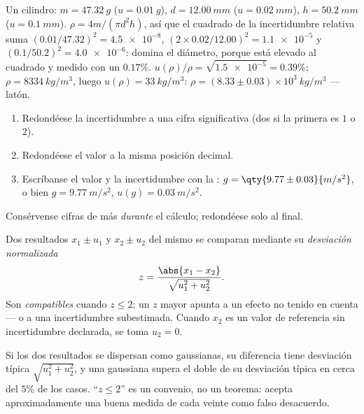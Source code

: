 \begin{example}\label{ex:b1:units-dimensions:density}
Un cilindro: $m = \qty{47.32}{g}$ ($u = \qty{0.01}{g}$),
$d = \qty{12.00}{mm}$ ($u = \qty{0.02}{mm}$), $h = \qty{50.2}{mm}$
($u = \qty{0.1}{mm}$). $\rho = 4m/(\pi d^2 h)$, así que el cuadrado de la
incertidumbre relativa suma $(0.01/47.32)^2 = \num{4.5e-8}$,
$(2 \times 0.02/12.00)^2 = \num{1.1e-5}$ y
$(0.1/50.2)^2 = \num{4.0e-6}$: domina el diámetro, porque está elevado al
cuadrado y medido con un $0.17\%$. $u(\rho)/\rho = \sqrt{\num{1.5e-5}}
= 0.39\%$; $\rho = \qty{8334}{kg/m^3}$, luego $u(\rho) = \qty{33}{kg/m^3}$:
$\rho = (8.33 \pm 0.03)\times10^3\ \unit{kg/m^3}$ --- latón.
\end{example}

\begin{method}\label{met:b1:units-dimensions:writing}
\begin{enumerate}
  \item Redondéese la incertidumbre a una cifra significativa (dos si la
        primera es $1$ o $2$).
  \item Redondéese el valor a la misma posición decimal.
  \item Escríbanse el valor y la incertidumbre con la :
        $g = \qty{9.77\pm0.03}{m/s^2}$, o bien $g = \qty{9.77}{m/s^2}$,
        $u(g) = \qty{0.03}{m/s^2}$.
\end{enumerate}
Consérvense cifras de más \emph{durante} el cálculo; redondéese solo al final.
\end{method}

\begin{definition}\label{def:b1:units-dimensions:zscore}
Dos resultados $x_1 \pm u_1$ y $x_2 \pm u_2$ del mismo  se
comparan mediante su \emph{desviación normalizada}
\[
z = \frac{\abs{x_1 - x_2}}{\sqrt{u_1^2 + u_2^2}} .
\]
Son \emph{compatibles} cuando $z \leq 2$; un $z$ mayor apunta a un efecto
no tenido en cuenta --- o a una incertidumbre subestimada. Cuando $x_2$ es
un valor de referencia sin incertidumbre declarada, se toma $u_2 = 0$.
\end{definition}

\begin{remark}\label{rem:b1:units-dimensions:why2}
Si los dos resultados se dispersan como gaussianas, su diferencia tiene
desviación típica $\sqrt{u_1^2 + u_2^2}$, y una gaussiana supera el doble
de su desviación típica en cerca del $5\%$ de los casos. ``$z \leq 2$'' es
un convenio, no un teorema: acepta aproximadamente una buena medida de
cada veinte como falso desacuerdo.
\end{remark}

